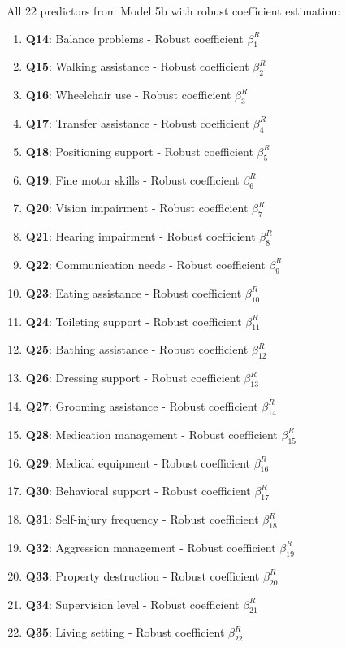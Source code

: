 All 22 predictors from Model 5b with robust coefficient estimation:
\begin{enumerate}
    \item \textbf{Q14}: Balance problems - Robust coefficient $\beta_1^R$
    \item \textbf{Q15}: Walking assistance - Robust coefficient $\beta_2^R$
    \item \textbf{Q16}: Wheelchair use - Robust coefficient $\beta_3^R$
    \item \textbf{Q17}: Transfer assistance - Robust coefficient $\beta_4^R$
    \item \textbf{Q18}: Positioning support - Robust coefficient $\beta_5^R$
    \item \textbf{Q19}: Fine motor skills - Robust coefficient $\beta_6^R$
    \item \textbf{Q20}: Vision impairment - Robust coefficient $\beta_7^R$
    \item \textbf{Q21}: Hearing impairment - Robust coefficient $\beta_8^R$
    \item \textbf{Q22}: Communication needs - Robust coefficient $\beta_9^R$
    \item \textbf{Q23}: Eating assistance - Robust coefficient $\beta_{10}^R$
    \item \textbf{Q24}: Toileting support - Robust coefficient $\beta_{11}^R$
    \item \textbf{Q25}: Bathing assistance - Robust coefficient $\beta_{12}^R$
    \item \textbf{Q26}: Dressing support - Robust coefficient $\beta_{13}^R$
    \item \textbf{Q27}: Grooming assistance - Robust coefficient $\beta_{14}^R$
    \item \textbf{Q28}: Medication management - Robust coefficient $\beta_{15}^R$
    \item \textbf{Q29}: Medical equipment - Robust coefficient $\beta_{16}^R$
    \item \textbf{Q30}: Behavioral support - Robust coefficient $\beta_{17}^R$
    \item \textbf{Q31}: Self-injury frequency - Robust coefficient $\beta_{18}^R$
    \item \textbf{Q32}: Aggression management - Robust coefficient $\beta_{19}^R$
    \item \textbf{Q33}: Property destruction - Robust coefficient $\beta_{20}^R$
    \item \textbf{Q34}: Supervision level - Robust coefficient $\beta_{21}^R$
    \item \textbf{Q35}: Living setting - Robust coefficient $\beta_{22}^R$
\end{enumerate}

